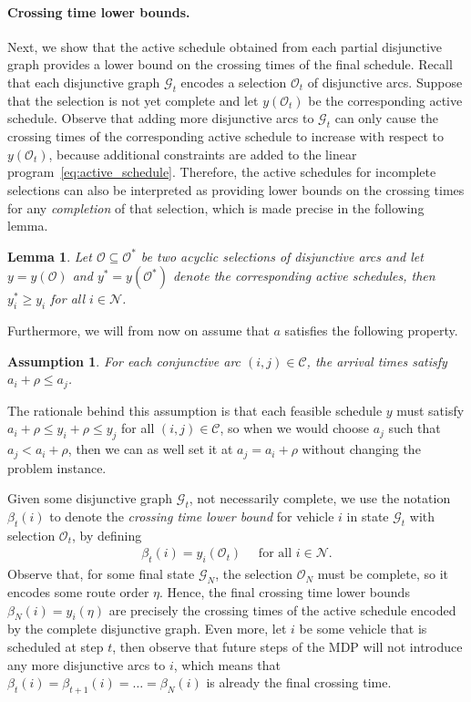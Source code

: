 \documentclass[a4paper]{report}
\theoremstyle{definition}
\theoremstyle{plain}
\newtheorem{lemma}{Lemma}[chapter]
\newtheorem{assump}{Assumption}[chapter]
\begin{document}
\paragraph{Crossing time lower bounds.}
Next, we show that the active schedule obtained from each partial disjunctive
graph provides a lower bound on the crossing times of the final schedule.
%
Recall that each disjunctive graph $\mathcal{G}_t$ encodes a selection
$\mathcal{O}_t$ of disjunctive arcs.
%
Suppose that the selection is not yet complete and let $y(\mathcal{O}_t)$ be the
corresponding active schedule.
%
Observe that adding more disjunctive arcs to $\mathcal{G}_t$ can only cause the
crossing times of the corresponding active schedule to increase with respect to
$y(\mathcal{O}_t)$, because additional constraints are added to the linear
program~\eqref{eq:active_schedule}.
%
Therefore, the active schedules for incomplete selections can also be
interpreted as providing lower bounds on the crossing times for any \emph{completion}
of that selection, which is made precise in the following lemma.
%
\begin{lemma}
  Let $\mathcal{O} \subseteq \mathcal{O}^*$ be two acyclic selections of disjunctive
  arcs and let $y = y(\mathcal{O})$ and $y^* = y(\mathcal{O}^{*})$ denote the
  corresponding active schedules, then $y^{*}_i \geq y_i$ for all
  $i \in \mathcal{N}$.
\end{lemma}

Furthermore, we will from now on assume that $a$ satisfies the following property.
\begin{assump}\label{assump:arrivals}
  For each conjunctive arc $(i, j) \in \mathcal{C}$, the arrival times satisfy
  $a_i + \rho \leq a_j$.
\end{assump}
\noindent
The rationale behind this assumption is that each feasible schedule $y$ must
satisfy $a_i + \rho \leq y_i + \rho \leq y_j$ for all $(i,j) \in \mathcal{C}$,
so when we would choose $a_j$ such that $a_j < a_i + \rho$, then we can as well
set it at $a_j = a_i + \rho$ without changing the problem instance.


\noindent
Given some disjunctive graph $\mathcal{G}_t$, not necessarily complete, we use
the notation $\beta_t(i)$ to denote the \emph{crossing time lower bound} for vehicle $i$ in
state $\mathcal{G}_t$ with selection $\mathcal{O}_t$, by defining
\begin{align}
  \beta_t(i) = y_i(\mathcal{O}_t) \quad \text{ for all } i \in \mathcal{N} .
\end{align}
%
Observe that, for some final state $\mathcal{G}_N$, the selection
$\mathcal{O}_N$ must be complete, so it encodes some route order $\eta$. Hence,
the final crossing time lower bounds $\beta_N(i) = y_i(\eta)$ are precisely the
crossing times of the active schedule encoded by the complete disjunctive graph.
%
Even more, let $i$ be some vehicle that is scheduled at step $t$, then observe
that future steps of the MDP will not introduce any more disjunctive arcs to
$i$, which means that $\beta_t(i) = \beta_{t+1}(i) = \dots = \beta_N(i)$ is
already the final crossing time.
\end{document}
